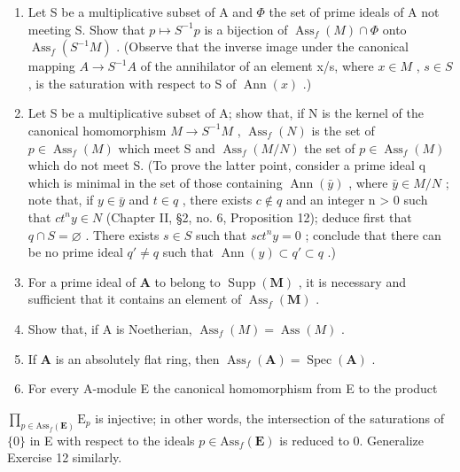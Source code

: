 \begin{enumerate}
\def\labelenumi{(\alph{enumi})}
\setcounter{enumi}{3}
\item
  Let S be a multiplicative subset of A and \(\Phi\) the set of prime ideals of A not meeting S. Show that \(p \mapsto S^{-1}p\) is a bijection of \(\operatorname{Ass}_{f}(M) \cap \Phi\) onto \(\operatorname{Ass}_{f}(S^{-1}M)\) . (Observe that the inverse image under the canonical mapping \(A \to S^{-1}A\) of the annihilator of an element x/s, where \(x \in M\) , \(s \in S\) , is the saturation with respect to S of \(\operatorname{Ann}(x)\) .)
\item
  Let S be a multiplicative subset of A; show that, if N is the kernel of the canonical homomorphism \(M \to S^{-1}M\) , \(\operatorname{Ass}_{f}(N)\) is the set of \(p \in \operatorname{Ass}_{f}(M)\) which meet S and \(\operatorname{Ass}_{f}(M/N)\) the set of \(p \in \operatorname{Ass}_{f}(M)\) which do not meet S. (To prove the latter point, consider a prime ideal q which is minimal in the set of those containing \(\operatorname{Ann}(\bar{y})\) , where \(\bar{y} \in M/N\) ; note that, if \(y \in \bar{y}\) and \(t \in q\) , there exists \(c \notin q\) and an integer n \textgreater{} 0 such that \(ct^{n}y \in N\) (Chapter II, §2, no. 6, Proposition 12); deduce first that \(q \cap S = \varnothing\) . There exists \(s \in S\) such that \(sct^{n}y = 0\) ; conclude that there can be no prime ideal \(q' \neq q\) such that \(\operatorname{Ann}(y) \subset q' \subset q\) .)
\item
  For a prime ideal of \(\mathbf{A}\) to belong to \(\operatorname{Supp}(\mathbf{M})\) , it is necessary and sufficient that it contains an element of \(\operatorname{Ass}_f(\mathbf{M})\) .
\item
  Show that, if A is Noetherian, \(\operatorname{Ass}_f(M) = \operatorname{Ass}(M)\) .
\item
  If \(\mathbf{A}\) is an absolutely flat ring, then \(\operatorname{Ass}_f(\mathbf{A}) = \operatorname{Spec}(\mathbf{A})\) .
\item
  For every A-module E the canonical homomorphism from E to the product
\end{enumerate}

\(\prod_{p\in\mathrm{Ass}_{f}(\mathbf{E})}\mathrm{E}_{p}\) is injective; in other words, the intersection of the saturations of \(\{0\}\) in E with respect to the ideals \(p\in\mathrm{Ass}_{f}(\mathbf{E})\) is reduced to 0. Generalize Exercise 12 similarly.

